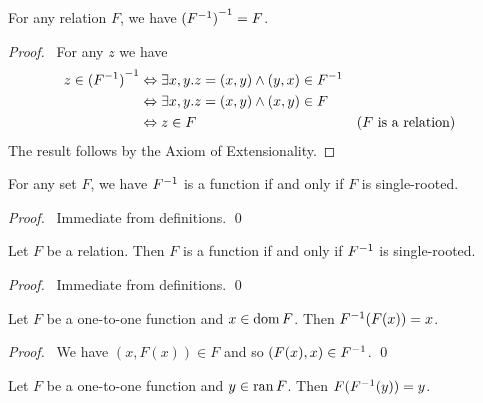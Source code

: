 \begin{theorem}
    \label{theorem:inv_inv}
    For any relation $F$, we have ${({F}^{-1})}^{-1} = F$.
\end{theorem}

\begin{proof}
    \pf\ For any $z$ we have
    \begin{align*}
        z \in {(\ensuremath{{F}^{-1}})}^{-1} & \Leftrightarrow \exists x, y. z = (x,y) \wedge (y,x) \in {F}^{-1} \\
        & \Leftrightarrow \exists x,y. z = (x,y) \wedge (x,y) \in F \\
        & \Leftrightarrow z \in F & (\text{$F$ is a relation})
    \end{align*}
    The result follows by the Axiom of Extensionality.
\end{proof}

\begin{theorem}
    \label{theorem:inv_function}
    For any set $F$, we have ${F}^{-1}$ is a function if and only if $F$ is single-rooted.
\end{theorem}

\begin{proof}
    \pf\ Immediate from definitions. \qed
\end{proof}

\begin{theorem}
    Let $F$ be a relation. Then $F$ is a function if and only if ${F}^{-1}$ is single-rooted.
\end{theorem}

\begin{proof}
    \pf\ Immediate from definitions. \qed
\end{proof}

\begin{theorem}
    \label{theorem:inv_F_of_F}
    Let $F$ be a one-to-one function and $x \in \operatorname{dom} F$. Then ${F}^{-1}(F(x)) = x$.
\end{theorem}

\begin{proof}
    \pf\ We have $(x, F(x)) \in F$ and so $(F(x), x) \in {F}^{-1}$. \qed
\end{proof}

\begin{theorem}
    Let $F$ be a one-to-one function and $y \in \operatorname{ran} F$. Then $F({F}^{-1}(y)) = y$.
\end{theorem}

